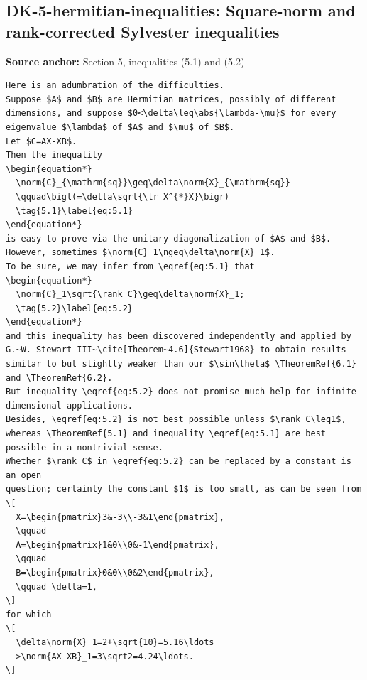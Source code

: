 \subsection*{DK-5-hermitian-inequalities: Square-norm and rank-corrected Sylvester inequalities}
\noindent\textbf{Source anchor:} Section 5, inequalities (5.1) and (5.2)\\
\begin{verbatim}
Here is an adumbration of the difficulties.
Suppose $A$ and $B$ are Hermitian matrices, possibly of different dimensions, and suppose $0<\delta\leq\abs{\lambda-\mu}$ for every eigenvalue $\lambda$ of $A$ and $\mu$ of $B$.
Let $C=AX-XB$.
Then the inequality
\begin{equation*}
  \norm{C}_{\mathrm{sq}}\geq\delta\norm{X}_{\mathrm{sq}}
  \qquad\bigl(=\delta\sqrt{\tr X^{*}X}\bigr)
  \tag{5.1}\label{eq:5.1}
\end{equation*}
is easy to prove via the unitary diagonalization of $A$ and $B$.
However, sometimes $\norm{C}_1\ngeq\delta\norm{X}_1$.
To be sure, we may infer from \eqref{eq:5.1} that
\begin{equation*}
  \norm{C}_1\sqrt{\rank C}\geq\delta\norm{X}_1;
  \tag{5.2}\label{eq:5.2}
\end{equation*}
and this inequality has been discovered independently and applied by G.~W. Stewart III~\cite[Theorem~4.6]{Stewart1968} to obtain results similar to but slightly weaker than our $\sin\theta$ \TheoremRef{6.1} and \TheoremRef{6.2}.
But inequality \eqref{eq:5.2} does not promise much help for infinite-dimensional applications.
Besides, \eqref{eq:5.2} is not best possible unless $\rank C\leq1$, whereas \TheoremRef{5.1} and inequality \eqref{eq:5.1} are best possible in a nontrivial sense.
Whether $\rank C$ in \eqref{eq:5.2} can be replaced by a constant is an open
question; certainly the constant $1$ is too small, as can be seen from
\[
  X=\begin{pmatrix}3&-3\\-3&1\end{pmatrix},
  \qquad
  A=\begin{pmatrix}1&0\\0&-1\end{pmatrix},
  \qquad
  B=\begin{pmatrix}0&0\\0&2\end{pmatrix},
  \qquad \delta=1,
\]
for which
\[
  \delta\norm{X}_1=2+\sqrt{10}=5.16\ldots
  >\norm{AX-XB}_1=3\sqrt2=4.24\ldots.
\]
\end{verbatim}

